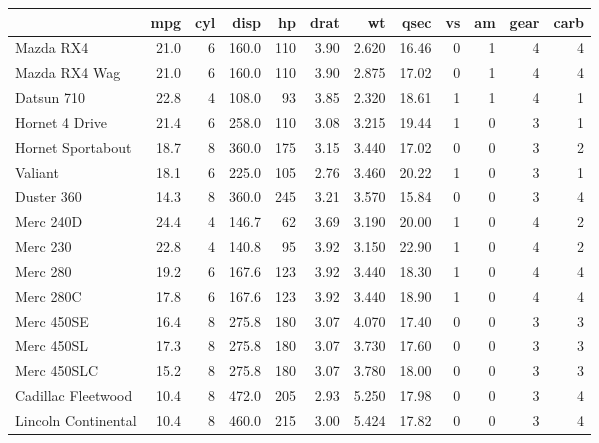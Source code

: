 \documentclass[11pt]{article}
\begin{document}
\newpage
\begin{appendices}
\begin{table}[h!]
\centering
\begin{tabular}{lrrrrrrrrrrr}
\toprule
{} &   mpg &  cyl &   disp &   hp &  drat &     wt &   qsec &  vs &  am &  gear &  carb \\
\midrule
Mazda RX4           &  21.0 &    6 &  160.0 &  110 &  3.90 &  2.620 &  16.46 &   0 &   1 &     4 &     4 \\
Mazda RX4 Wag       &  21.0 &    6 &  160.0 &  110 &  3.90 &  2.875 &  17.02 &   0 &   1 &     4 &     4 \\
Datsun 710          &  22.8 &    4 &  108.0 &   93 &  3.85 &  2.320 &  18.61 &   1 &   1 &     4 &     1 \\
Hornet 4 Drive      &  21.4 &    6 &  258.0 &  110 &  3.08 &  3.215 &  19.44 &   1 &   0 &     3 &     1 \\
Hornet Sportabout   &  18.7 &    8 &  360.0 &  175 &  3.15 &  3.440 &  17.02 &   0 &   0 &     3 &     2 \\
Valiant             &  18.1 &    6 &  225.0 &  105 &  2.76 &  3.460 &  20.22 &   1 &   0 &     3 &     1 \\
Duster 360          &  14.3 &    8 &  360.0 &  245 &  3.21 &  3.570 &  15.84 &   0 &   0 &     3 &     4 \\
Merc 240D           &  24.4 &    4 &  146.7 &   62 &  3.69 &  3.190 &  20.00 &   1 &   0 &     4 &     2 \\
Merc 230            &  22.8 &    4 &  140.8 &   95 &  3.92 &  3.150 &  22.90 &   1 &   0 &     4 &     2 \\
Merc 280            &  19.2 &    6 &  167.6 &  123 &  3.92 &  3.440 &  18.30 &   1 &   0 &     4 &     4 \\
Merc 280C           &  17.8 &    6 &  167.6 &  123 &  3.92 &  3.440 &  18.90 &   1 &   0 &     4 &     4 \\
Merc 450SE          &  16.4 &    8 &  275.8 &  180 &  3.07 &  4.070 &  17.40 &   0 &   0 &     3 &     3 \\
Merc 450SL          &  17.3 &    8 &  275.8 &  180 &  3.07 &  3.730 &  17.60 &   0 &   0 &     3 &     3 \\
Merc 450SLC         &  15.2 &    8 &  275.8 &  180 &  3.07 &  3.780 &  18.00 &   0 &   0 &     3 &     3 \\
Cadillac Fleetwood  &  10.4 &    8 &  472.0 &  205 &  2.93 &  5.250 &  17.98 &   0 &   0 &     3 &     4 \\
Lincoln Continental &  10.4 &    8 &  460.0 &  215 &  3.00 &  5.424 &  17.82 &   0 &   0 &     3 &     4 \\

\end{tabular}
\end{table}
\end{appendices}
\end{document}
